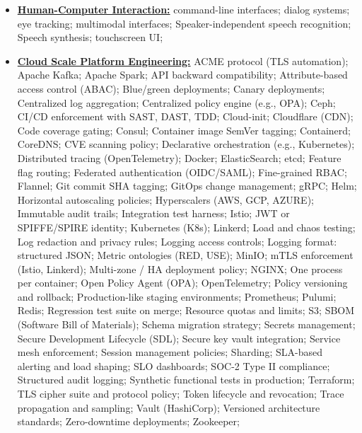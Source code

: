 \documentclass[letterpaper,11pt]{article}
\begin{document}
{\begin{itemize}[leftmargin=0.1in, label={}, itemsep=0pt, parsep=0pt, topsep=0pt, partopsep=0pt]
\item
    \textbf{\underline{Human-Computer Interaction:}} \hspace{0pt}
    command-line interfaces;
    dialog systems;
    eye tracking;
    multimodal interfaces;
    Speaker-independent speech recognition;
    Speech synthesis;
    touchscreen UI;
\item
    \textbf{\underline{Cloud Scale Platform Engineering:}} \hspace{0pt}
    ACME protocol (TLS automation);
    Apache Kafka;
    Apache Spark;
    API backward compatibility;
    Attribute-based access control (ABAC);
    Blue/green deployments;
    Canary deployments;
    Centralized log aggregation;
    Centralized policy engine (e.g., OPA);
    Ceph;
    CI/CD enforcement with SAST, DAST, TDD;
    Cloud-init;
    Cloudflare (CDN);
    Code coverage gating;
    Consul;
    Container image SemVer tagging;
    Containerd;
    CoreDNS;
    CVE scanning policy;
    Declarative orchestration (e.g., Kubernetes);
    Distributed tracing (OpenTelemetry);
    Docker;
    ElasticSearch;
    etcd;
    Feature flag routing;
    Federated authentication (OIDC/SAML);
    Fine-grained RBAC;
    Flannel;
    Git commit SHA tagging;
    GitOps change management;
    gRPC;
    Helm;
    Horizontal autoscaling policies;
    Hyperscalers (AWS, GCP, AZURE);
    Immutable audit trails;
    Integration test harness;
    Istio;
    JWT or SPIFFE/SPIRE identity;
    Kubernetes (K8s);
    Linkerd;
    Load and chaos testing;
    Log redaction and privacy rules;
    Logging access controls;
    Logging format: structured JSON;
    Metric ontologies (RED, USE);
    MinIO;
    mTLS enforcement (Istio, Linkerd);
    Multi-zone / HA deployment policy;
    NGINX;
    One process per container;
    Open Policy Agent (OPA);
    OpenTelemetry;
    Policy versioning and rollback;
    Production-like staging environments;
    Prometheus;
    Pulumi;
    Redis;
    Regression test suite on merge;
    Resource quotas and limits;
    S3;
    SBOM (Software Bill of Materials);
    Schema migration strategy;
    Secrets management;
    Secure Development Lifecycle (SDL);
    Secure key vault integration;
    Service mesh enforcement;
    Session management policies;
    Sharding;
    SLA-based alerting and load shaping;
    SLO dashboards;
    SOC-2 Type II compliance;
    Structured audit logging;
    Synthetic functional tests in production;
    Terraform;
    TLS cipher suite and protocol policy;
    Token lifecycle and revocation;
    Trace propagation and sampling;
    Vault (HashiCorp);
    Versioned architecture standards;
    Zero-downtime deployments;
    Zookeeper;

\end{itemize}
}
\end{document}
